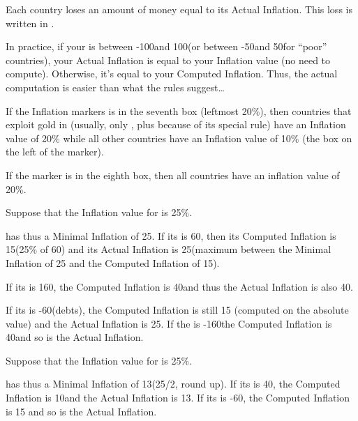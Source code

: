 \aparag[Inflation]
\bparag Each country loses an amount of money equal to its Actual Inflation.
\bparag This loss is written in .

\begin{designnote}
  In practice, if your \RT is between -100\ducats and 100\ducats (or between
  -50\ducats and 50\ducats for ``poor'' countries), your Actual Inflation is
  equal to your Inflation value (no need to compute). Otherwise, it's equal to
  your Computed Inflation. Thus, the actual computation is easier than what
  the rules suggest\ldots
\end{designnote}

\begin{exemple}
  If the Inflation markers is in the seventh box (leftmost 20\%), then
  countries that exploit gold in \continentAmerica (usually, only \HIS, plus
  \TUR because of its special rule) have an Inflation value of 20\% while all
  other countries have an Inflation value of 10\% (the box on the left of the
  marker).

  If the marker is in the eighth box, then all countries have an inflation
  value of 20\%.
\end{exemple}

\begin{exemple}
  Suppose that the Inflation value for \FRA is 25\%.

  \FRA has thus a Minimal Inflation of 25\ducats. If its \RT is 60\ducats,
  then its Computed Inflation is 15\ducats (25\% of 60\ducats) and its Actual
  Inflation is 25\ducats (maximum between the Minimal Inflation of 25\ducats
  and the Computed Inflation of 15\ducats).
  
  If its \RT is 160\ducats, the Computed Inflation is 40\ducats and thus the
  Actual Inflation is also 40\ducats.

  If its \RT is -60\ducats (debts), the Computed Inflation is still 15\ducats
  (computed on the absolute value) and the Actual Inflation is 25\ducats. If
  the \RT is -160\ducats the Computed Inflation is 40\ducats and so is the
  Actual Inflation.
\end{exemple}

\begin{exemple}
  Suppose that the Inflation value for \POL is 25\%.

  \POL has thus a Minimal Inflation of 13\ducats (25/2, round up). If its \RT
  is 40\ducats, the Computed Inflation is 10\ducats and the Actual Inflation
  is 13\ducats. If its \RT is -60\ducats, the Computed Inflation is 15\ducats
  and so is the Actual Inflation.
\end{exemple}

